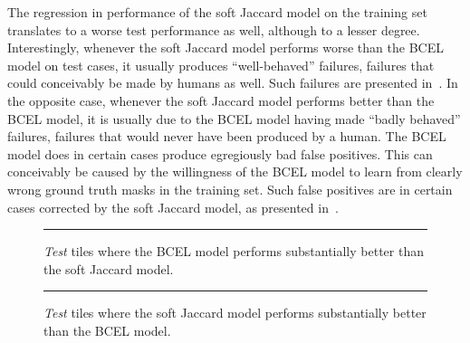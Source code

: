 The regression in performance of the soft Jaccard model on the training set translates to a worse test performance as well, although to a lesser degree.
Interestingly, whenever the soft Jaccard model performs worse than the BCEL model on test cases, it usually produces \enquote{well-behaved} failures, failures that could conceivably be made by humans as well.
Such failures are presented in~.
In the opposite case, whenever the soft Jaccard model performs better than the BCEL model, it is usually due to the BCEL model having made \enquote{badly behaved} failures, failures that would never have been produced by a human.
The BCEL model does in certain cases produce egregiously bad false positives.
This can conceivably be caused by the willingness of the BCEL model to learn from clearly wrong ground truth masks in the training set.
Such false positives are in certain cases corrected by the soft Jaccard model, as presented in~.

\begin{figure}[H]
  \centering
  \rule[1ex]{\textwidth}{.5pt}
  \caption{%
    \emph{Test} tiles where the BCEL model performs substantially better than the soft Jaccard model.
  }%
  \label{fig:soft-test-failures}
\end{figure}

\begin{figure}[H]
  \centering
  \rule[1ex]{\textwidth}{.5pt}
  \caption{%
    \emph{Test} tiles where the soft Jaccard model performs substantially better than the BCEL model.
  }%
  \label{fig:soft-better-than-bcel}
\end{figure}
